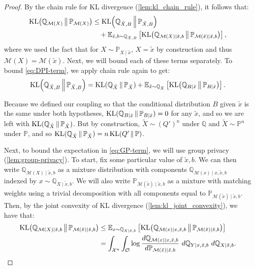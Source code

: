 \documentclass{article}
\DeclareMathOperator{\KLop}{KL}
\newcommand{\KL}[2]{%
  \mathchoice
    {\KLop\!\left(#1\,\middle\|\,#2\right)}%
    {\KLop(#1\,\Vert\,#2)}%
    {\KLop(#1\,\Vert\,#2)}%
    {\KLop(#1\,\Vert\,#2)}%
}
\newcommand{\Null}{\mathbb{P}}
\newcommand{\E}{\mathbb{E}}
\newcommand{\Alt}{\mathbb{Q}}
\newcommand{\M}{\mathcal{M}}
\begin{document}
\begin{proof}
By the chain rule for KL divergence (\cref{lem:kl_chain_rule}), it follows that:
\begin{align}
     \KL{\Alt_{\M(X)}}{\Null_{\M(X)}}
     &\leq 
     \KL{\Alt_{\tilde X, B}}{\Null_{\tilde X, B}} \label{eq:DPI-term}\\
     &\quad+ \E_{\tilde x, b \sim \Alt_{\tilde X, B}}\left[ \KL{\Alt_{\M(X)\mid \tilde x, b}}{\Null_{\M(\tilde x) \mid \tilde x, b}} \right] \label{eq:GP-term},
\end{align}
where we used the fact that for $X \sim \Null_{X \mid \tilde x}$, $X = \tilde x$ by construction and thus $\M(X) = \M(\tilde x)$. Next, we will bound each of these terms separately. To bound \cref{eq:DPI-term}, we apply chain rule again to get: 
\begin{equation*}
    \KL{\Alt_{\tilde X, B}}{\Null_{\tilde X, B}}
    = \KL{\Alt_{\tilde X}}{\Null_{\tilde X}} + 
    \E_{\tilde x \sim \Alt_{\tilde X}}\left[ \KL{\Alt_{B \mid \tilde x} }{\Null_{B \mid \tilde x}} \right].
\end{equation*}

Because we defined our coupling so that the conditional distribution $B$ given $\tilde x$ is the same under both hypotheses, $\KL{\Alt_{B \mid \tilde x} }{\Null_{B \mid \tilde x}} = 0$ for any $\tilde x$, and so we are left with $\KL{\Alt_{\tilde X}}{\Null_{\tilde X}}$. But by construction, $\tilde X \sim (Q')^n$ under $\Alt$ and $\tilde X \sim \Null^n$ under $\Null$, and so   $\KL{\Alt_{\tilde X}}{\Null_{\tilde X}} = n \KL{Q'}{\Null}$.

Next, to bound the expectation in \cref{eq:GP-term}, we will use group privacy (\cref{lem:group-privacy}). To start, fix some particular value of $\tilde x, b$. We can then write $\Alt_{\M(X) \mid \tilde x, b}$ as a mixture distribution with components $\Alt_{\M(x) \mid x, \tilde x, b}$ indexed by $x \sim \Alt_{X \mid \tilde x, b}$. 
We will also write $\Null_{\M(\tilde x) \mid \tilde x, b}$ as a mixture with matching weights using a trivial decomposition with all components equal to $\Null_{\M(\tilde x) \mid  \tilde x, b}$.
Then, by the joint convexity of KL divergence (\cref{lem:kl_joint_convexity}), we have that:
\begin{align*}
    \KL{\Alt_{\M(X) \mid \tilde x, b}}{\Null_{\M(\tilde x) \mid \tilde x, b}} 
    &\leq \E_{x \sim \Alt_{X \mid \tilde x, b}} \left[\KL{\Alt_{\M(x) \mid x, \tilde x, b}}{\Null_{\M(\tilde x) \mid \tilde x, b}} \right]  \\
    &= \int_{\mathcal{X}^n} \int_{\mathcal{O}} \log \frac{d\Alt_{\M(x)\mid x,\tilde x,b}}{d\Null_{\M(\tilde x)\mid \tilde x,b}}~d\Alt_{Y \mid x, \tilde x, b}~d\Alt_{X \mid \tilde x,b}.
\end{align*}



\end{proof}
\end{document}
